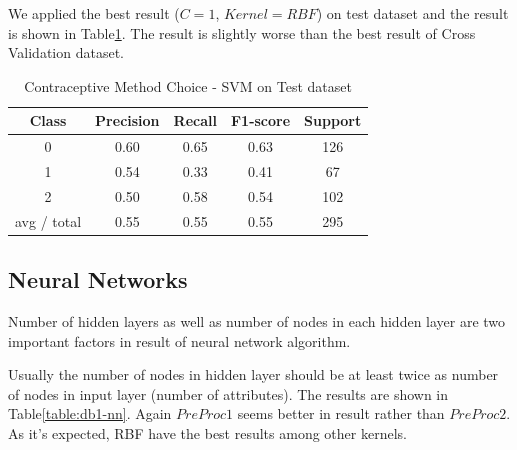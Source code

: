 We applied the best result ($C=1$, $Kernel=RBF$) on test dataset and the result is shown in Table\ref{table:db1-svm-test}. The result is slightly worse than the best result of Cross Validation dataset.


\begin{table}[p]
\begin{center}
\begin{tabular}{|c|c|c|c|c|}
\hline Class & Precision & Recall & F1-score & Support \\

\hline 0 & 0.60 & 0.65 & 0.63 & 126\\
\hline 1 & 0.54 & 0.33 & 0.41 & 67\\
\hline 2 & 0.50 & 0.58 & 0.54 & 102\\
\hline avg / total & 0.55 & 0.55 & 0.55 & 295\\
\hline
\end{tabular}

\caption{Contraceptive Method Choice - SVM on Test dataset}
\label{table:db1-svm-test}
\end{center}
\end{table}


\subsection{Neural Networks}
Number of hidden layers as well as number of nodes in each hidden layer are two important factors in result of neural network algorithm. 

Usually the number of nodes in hidden layer should be at least twice as number of nodes in input layer (number of attributes). The results are shown in Table\ref{table:db1-nn}. Again $PreProc1$ seems better in result rather than $PreProc2$. As it's expected, RBF have the best results among other kernels.


